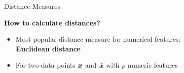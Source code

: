 % 
\begin{vbframe}{Distance Measures}





  
  
    \textbf{How to calculate distances?}
    \begin{itemize}
      \item Most popular distance measure for numerical features: \\
      \textbf{Euclidean distance}

      \item For two data points $\bm{x}$ and $\tilde{\bm{x}}$ with $p$ numeric features
  \end{itemize}      
    




\end{vbframe}




